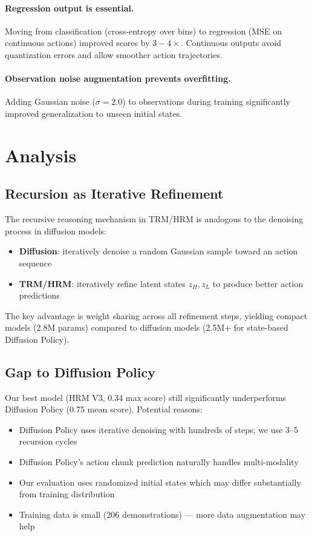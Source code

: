 \documentclass[11pt,a4paper]{article}
\begin{document}
\paragraph{Regression output is essential.} Moving from classification (cross-entropy over bins) to regression (MSE on continuous actions) improved scores by $3{-}4\times$. Continuous outputs avoid quantization errors and allow smoother action trajectories.

\paragraph{Observation noise augmentation prevents overfitting.} Adding Gaussian noise ($\sigma=2.0$) to observations during training significantly improved generalization to unseen initial states.

\section{Analysis}

\subsection{Recursion as Iterative Refinement}

The recursive reasoning mechanism in TRM/HRM is analogous to the denoising process in diffusion models:
\begin{itemize}[noitemsep]
    \item \textbf{Diffusion}: iteratively denoise a random Gaussian sample toward an action sequence
    \item \textbf{TRM/HRM}: iteratively refine latent states $z_H, z_L$ to produce better action predictions
\end{itemize}

The key advantage is weight sharing across all refinement steps, yielding compact models (2.8M params) compared to diffusion models (2.5M+ for state-based Diffusion Policy).

\subsection{Gap to Diffusion Policy}

Our best model (HRM V3, 0.34 max score) still significantly underperforms Diffusion Policy (0.75 mean score). Potential reasons:
\begin{itemize}[noitemsep]
    \item Diffusion Policy uses iterative denoising with hundreds of steps; we use 3--5 recursion cycles
    \item Diffusion Policy's action chunk prediction naturally handles multi-modality
    \item Our evaluation uses randomized initial states which may differ substantially from training distribution
    \item Training data is small (206 demonstrations) --- more data augmentation may help
\end{itemize}
\end{document}
